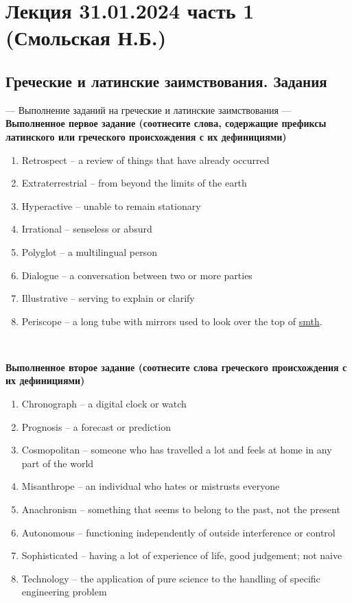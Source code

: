 \documentclass[main.tex]{subfiles}
\begin{document}
\section{Лекция 31.01.2024 часть 1 (Смольская Н.Б.)}

\subsection{Греческие и латинские заимствования. Задания}

--- Выполнение заданий на греческие и латинские заимствования ---
\\

\textbf{Выполненное первое задание (соотнесите слова, содержащие префиксы латинского или греческого происхождения с их дефинициями)}

\begin{enumerate}[nosep]
	\item Retrospect -- a review of things that have already occurred
	\item Extraterrestrial -- from beyond the limits of the earth
	\item Hyperactive -- unable to remain stationary
	\item Irrational -- senseless or absurd
	\item Polyglot -- a multilingual person
	\item Dialogue -- a conversation between two or more parties
	\item Illustrative -- serving to explain or clarify
	\item Periscope -- a long tube with mirrors used to look over the top of \underline{smth}.
\end{enumerate}
\ 

\textbf{Выполненное второе задание (соотнесите слова греческого происхождения с их дефинициями)}

\begin{enumerate}[nosep]
	\item Chronograph -- a digital clock or watch
	\item Prognosis -- a forecast or prediction
	\item Cosmopolitan -- someone who has travelled a lot and feels at home in any part of the world
	\item Misanthrope -- an individual who hates or mistrusts everyone
	\item Anachronism -- something that seems to belong to the past, not the present
	\item Autonomous -- functioning independently of outside interference or control
	\item Sophisticated -- having a lot of experience of life, good judgement; not naive
	\item Technology -- the application of pure science to the handling of specific engineering problem
\end{enumerate}
\ 
\end{document}
